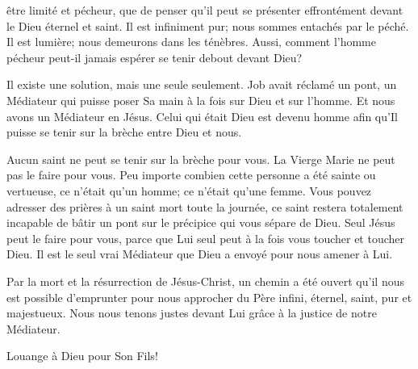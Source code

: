 


 être limité et pécheur, que de penser qu'il peut se présenter
 effrontément devant le Dieu éternel et saint.
 Il est infiniment pur; nous sommes entachés par le péché.
 Il est lumière; nous demeurons dans les ténèbres.
 Aussi, comment l'homme pécheur peut-il jamais espérer
 se tenir debout devant Dieu?

Il existe une solution, mais une seule seulement.
 Job avait réclamé un pont, un Médiateur qui puisse poser Sa main
 à la fois sur Dieu et sur l'homme. Et nous avons un Médiateur en Jésus.
 Celui qui était Dieu est devenu homme afin qu'Il puisse se tenir
 sur la brèche entre Dieu et nous.


Aucun saint ne peut se tenir sur la brèche pour vous.
 La Vierge Marie ne peut pas le faire pour vous.
 Peu importe combien cette personne a été sainte ou vertueuse,
 ce n'était qu'un homme; ce n'était qu'une femme.
 Vous pouvez adresser des prières à un saint mort toute la journée,
 ce saint restera totalement incapable de bâtir un pont sur le précipice
 qui vous sépare de Dieu. Seul Jésus peut le faire pour vous,
 parce que Lui seul peut à la fois vous toucher et toucher Dieu.
 Il est le seul vrai Médiateur que Dieu a envoyé pour nous amener à Lui.

Par la mort et la résurrection de Jésus-Christ, un chemin a été ouvert
 qu'il nous est possible d'emprunter pour nous approcher du Père infini,
 éternel, saint, pur et majestueux. 
Nous nous tenons justes devant Lui grâce à la justice de notre Médiateur.

Louange à Dieu pour Son Fils!

\dvrule




